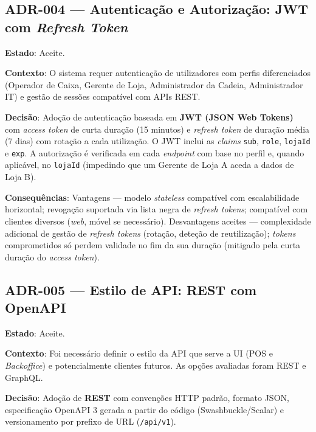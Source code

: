 \subsection*{ADR-004 --- Autenticação e Autorização: JWT com \textit{Refresh Token}}

\noindent\textbf{Estado}: Aceite.

\noindent\textbf{Contexto}: O sistema requer autenticação de utilizadores com perfis diferenciados (Operador de Caixa, Gerente de Loja, Administrador da Cadeia, Administrador IT) e gestão de sessões compatível com APIs REST.

\noindent\textbf{Decisão}: Adoção de autenticação baseada em \textbf{JWT (JSON Web Tokens)} com \textit{access token} de curta duração (15 minutos) e \textit{refresh token} de duração média (7 dias) com rotação a cada utilização. O JWT inclui as \textit{claims} \texttt{sub}, \texttt{role}, \texttt{lojaId} e \texttt{exp}. A autorização é verificada em cada \textit{endpoint} com base no perfil e, quando aplicável, no \texttt{lojaId} (impedindo que um Gerente de Loja A aceda a dados de Loja B).

\noindent\textbf{Consequências}: Vantagens --- modelo \textit{stateless} compatível com escalabilidade horizontal; revogação suportada via lista negra de \textit{refresh tokens}; compatível com clientes diversos (\textit{web}, móvel se necessário). Desvantagens aceites --- complexidade adicional de gestão de \textit{refresh tokens} (rotação, deteção de reutilização); \textit{tokens} comprometidos só perdem validade no fim da sua duração (mitigado pela curta duração do \textit{access token}).

\subsection*{ADR-005 --- Estilo de API: REST com OpenAPI}

\noindent\textbf{Estado}: Aceite.

\noindent\textbf{Contexto}: Foi necessário definir o estilo da API que serve a UI (POS e \textit{Backoffice}) e potencialmente clientes futuros. As opções avaliadas foram REST e GraphQL.

\noindent\textbf{Decisão}: Adoção de \textbf{REST} com convenções HTTP padrão, formato JSON, especificação OpenAPI 3 gerada a partir do código (Swashbuckle/Scalar) e versionamento por prefixo de URL (\texttt{/api/v1}).

